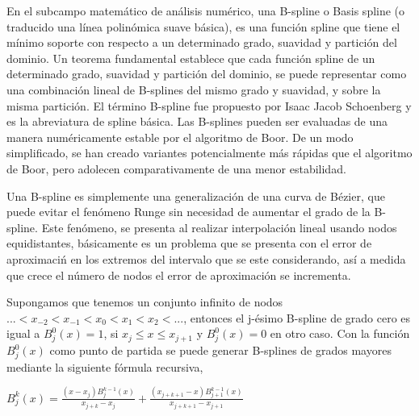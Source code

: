 \hspace{0.4cm} En el subcampo matem\'atico de an\'alisis num\'erico, una B-spline o Basis spline (o traducido una l\'inea polin\'omica suave b\'asica), es una funci\'on spline que tiene el m\'inimo soporte con respecto a un determinado grado, suavidad y partici\'on del dominio. Un teorema fundamental establece que cada funci\'on spline de un determinado grado, suavidad y partici\'on del dominio, se puede representar como una combinaci\'on lineal de B-splines del mismo grado y suavidad, y sobre la misma partici\'on. El t\'ermino B-spline fue propuesto por Isaac Jacob Schoenberg y es la abreviatura de spline b\'asica. Las B-splines pueden ser evaluadas de una manera num\'ericamente estable por el algoritmo de Boor. De un modo simplificado, se han creado variantes potencialmente m\'as r\'apidas que el algoritmo de Boor, pero adolecen comparativamente de una menor estabilidad.


\hspace{0.4cm} Una B-spline es simplemente una generalizaci\'on de una curva de B\'ezier, que puede evitar el fen\'omeno Runge sin necesidad de aumentar el grado de la B-spline. Este fen\'omeno, se presenta al realizar interpolaci\'on lineal usando nodos equidistantes, b\'asicamente es un problema que se presenta con el error de aproximaci\'n en los extremos del intervalo que se este considerando, as\'i a medida que crece el n\'umero de nodos el error de aproximaci\'on se incrementa. 


\hspace{0.4cm} Supongamos que tenemos un conjunto infinito de nodos $...<x_{-2}<x_{-1}<x_{0}<x_{1}<x_{2}<...$, entonces el j-\'esimo B-spline de grado cero es igual a $B^{0}_{j}(x)=1$, si $x_{j} \leq x \leq x_{j+1}$ y $B^{0}_{j}(x)=0$ en otro caso. Con la funci\'on $B^{0}_{j}(x)$ como punto de partida se puede generar B-splines de grados mayores mediante la siguiente f\'ormula recursiva,\\

\begin{center}

$\displaystyle{B^{k}_{j}(x) = \frac{(x-x_{j})B^{k-1}_{j}(x)}{x_{j+k}-x_{j}} + \frac{(x_{j+k+1}-x)B^{k-1}_{j+1}(x)}{x_{j+k+1}-x_{j+1}}}$
\end{center}

